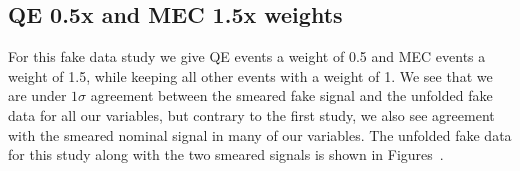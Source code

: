 \documentclass{article}
\begin{document}
\clearpage 

\subsection{QE 0.5x and MEC 1.5x weights}\label{sec:combined-weight}

For this fake data study we give QE events a weight of 0.5 and MEC events a weight of 1.5, while keeping all other events with a weight of 1.
We see that we are under $1\sigma$ agreement between the smeared fake signal and the unfolded fake data for all 
our variables, but contrary to the first study, we also see agreement with the smeared nominal signal in many of our variables.
The unfolded fake data for this study along with the two smeared signals is shown in Figures~.
\end{document}
